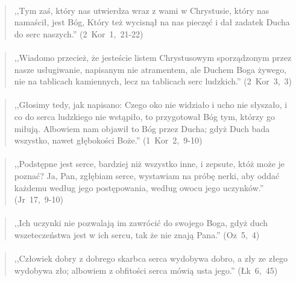 \documentclass[10pt,a4paper,oneside]{article}
\begin{document}
\paragraph{}
\begin{quote}
,,Tym zaś, który nas utwierdza wraz z wami w Chrystusie, który nas namaścił, jest Bóg, Który też wycisnął na nas pieczęć i dał zadatek Ducha do serc naszych.'' \mbox{(2 Kor 1, 21-22)}
\end{quote}
\paragraph{}
\begin{quote}
,,Wiadomo przecież, że jesteście listem Chrystusowym sporządzonym przez nasze usługiwanie, napisanym nie atramentem, ale Duchem Boga żywego, nie na tablicach kamiennych, lecz na tablicach serc ludzkich.'' \mbox{(2 Kor 3, 3)}
\end{quote}
\paragraph{}
\begin{quote}
,,Głosimy tedy, jak napisano: Czego oko nie widziało i ucho nie słyszało, i co do serca ludzkiego nie wstąpiło, to przygotował Bóg tym, którzy go miłują. Albowiem nam objawił to Bóg przez Ducha; gdyż Duch bada wszystko, nawet głębokości Boże.'' \mbox{(1 Kor 2, 9-10)}
\end{quote}
\paragraph{}
\begin{quote}
,,Podstępne jest serce, bardziej niż wszystko inne, i zepsute, któż może je poznać? Ja, Pan, zgłębiam serce, wystawiam na próbę nerki, aby oddać każdemu według jego postępowania, według owocu jego uczynków.'' \mbox{(Jr 17, 9-10)}
\end{quote}
\paragraph{}
\begin{quote}
,,Ich uczynki nie pozwalają im zawrócić do swojego Boga, gdyż duch wszeteczeństwa jest w ich sercu, tak że nie znają Pana.'' \mbox{(Oz 5, 4)}
\end{quote}
\paragraph{}
\begin{quote}
,,Człowiek dobry z dobrego skarbca serca wydobywa dobro, a zły ze złego wydobywa zło; albowiem z obfitości serca mówią usta jego.'' \mbox{(Łk 6, 45)}
\end{quote}
\end{document}
